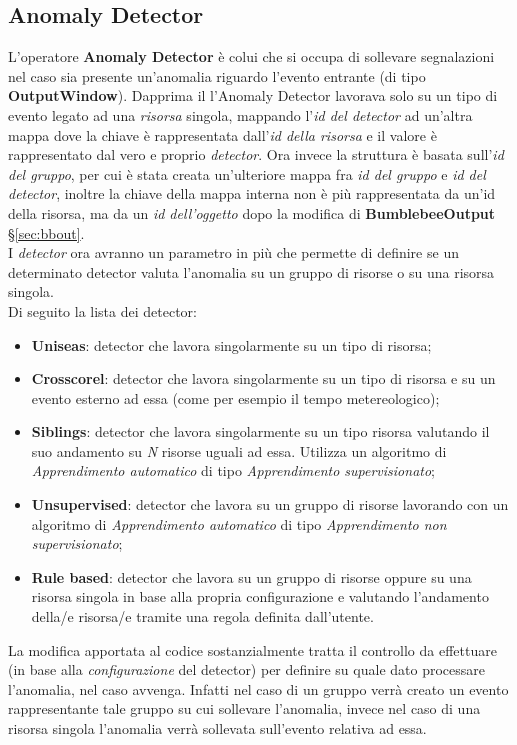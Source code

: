 \subsection{Anomaly Detector}
L'operatore \textbf{Anomaly Detector} è colui che si occupa di sollevare segnalazioni nel caso sia presente un'anomalia riguardo l'evento entrante (di tipo \textbf{OutputWindow}). Dapprima il l'Anomaly Detector lavorava solo su un tipo di evento legato ad una \textit{risorsa} singola, mappando l'\textit{id del detector} ad un'altra mappa dove la chiave è rappresentata dall'\textit{id della risorsa} e il valore è rappresentato dal vero e proprio \textit{detector}. Ora invece la struttura è basata sull'\textit{id del gruppo}, per cui è stata creata un'ulteriore mappa fra \textit{id del gruppo} e \textit{id del detector}, inoltre la chiave della mappa interna non è più rappresentata da un'id della risorsa, ma da un \textit{id dell'oggetto} dopo la modifica di \textbf{BumblebeeOutput} \S\ref{sec:bbout}.\\
I \textit{detector} ora avranno un parametro in più che permette di definire se un determinato detector valuta l'anomalia su un gruppo di risorse o su una risorsa singola.\\
Di seguito la lista dei detector:
\begin{itemize}
	\item{\textbf{Uniseas}: detector che lavora singolarmente su un tipo di risorsa;}
	\item{\textbf{Crosscorel}: detector che lavora singolarmente su un tipo di risorsa e su un evento esterno ad essa (come per esempio il tempo metereologico);}
	\item{\textbf{Siblings}: detector che lavora singolarmente su un tipo risorsa valutando il suo andamento su \textit{N} risorse uguali ad essa. Utilizza un algoritmo di \textit{\gls{Apprendimento automatico}} di tipo \textit{\gls{Apprendimento supervisionato}};}
	\item{\textbf{Unsupervised}: detector che lavora su un gruppo di risorse lavorando con un algoritmo di \textit{\gls{Apprendimento automatico}} di tipo \textit{\gls{Apprendimento non supervisionato}};}
	\item{\textbf{Rule based}: detector che lavora su un gruppo di risorse oppure su una risorsa singola in base alla propria configurazione e valutando l'andamento della/e risorsa/e tramite una regola definita dall'utente.}
\end{itemize}

La modifica apportata al codice sostanzialmente tratta il controllo da effettuare (in base alla \textit{configurazione} del detector) per definire su quale dato processare l'anomalia, nel caso avvenga. Infatti nel caso di un gruppo verrà creato un evento rappresentante tale gruppo su cui sollevare l'anomalia, invece nel caso di una risorsa singola l'anomalia verrà sollevata sull'evento relativa ad essa. 



